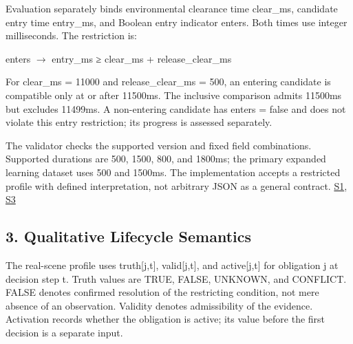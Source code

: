 \documentclass[11pt,a4paper]{article}
\begin{document}
Evaluation separately binds environmental clearance time {\ttfamily\small clear\_\allowbreak{}ms}, candidate entry time {\ttfamily\small entry\_\allowbreak{}ms}, and Boolean entry indicator {\ttfamily\small enters}. Both times use integer milliseconds. The restriction is:\par

{\ttfamily\small enters \ensuremath{\rightarrow} entry\_\allowbreak{}ms ≥ clear\_\allowbreak{}ms + release\_\allowbreak{}clear\_\allowbreak{}ms}\par

For {\ttfamily\small clear\_\allowbreak{}ms = 11000} and {\ttfamily\small release\_\allowbreak{}clear\_\allowbreak{}ms = 500}, an entering candidate is compatible only at or after 11500ms. The inclusive comparison admits 11500ms but excludes 11499ms. A non-entering candidate has {\ttfamily\small enters = false} and does not violate this entry restriction; its progress is assessed separately.\par

The validator checks the supported version and fixed field combinations. Supported durations are 500, 1500, 800, and 1800ms; the primary expanded learning dataset uses 500 and 1500ms. The implementation accepts a restricted profile with defined interpretation, not arbitrary JSON as a general contract. \href{\detokenize{../../../../../../projects/04-guardsynth-coc/experiments/paper1_cnl_learning/temporal_preservation.py}}{S1}, \href{\detokenize{../../../../../../projects/04-guardsynth-coc/experiments/paper1_cnl_learning/temporal_training_data.py}}{S3}\par

\subsection*{3. Qualitative Lifecycle Semantics}

The real-scene profile uses {\ttfamily\small truth[j,t]}, {\ttfamily\small valid[j,t]}, and {\ttfamily\small active[j,t]} for obligation j at decision step t. Truth values are TRUE, FALSE, UNKNOWN, and CONFLICT. FALSE denotes confirmed resolution of the restricting condition, not mere absence of an observation. Validity denotes admissibility of the evidence. Activation records whether the obligation is active; its value before the first decision is a separate input.\par
\end{document}
